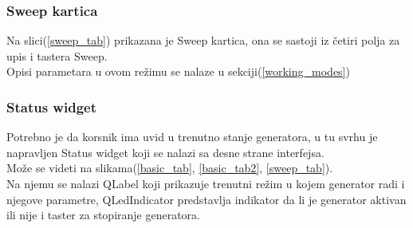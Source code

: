 \begin{figure}[H]
\end{figure}

\subsubsection{Sweep kartica}

Na slici(\ref{sweep_tab}) prikazana je Sweep kartica, ona se sastoji iz četiri
polja za upis i tastera Sweep. \\
Opisi parametara u ovom režimu se nalaze u sekciji(\ref{working_modes})

\begin{figure}[H]
\end{figure}

\subsubsection{Status widget}

Potrebno je da korsnik ima uvid u trenutno stanje generatora, u tu svrhu je
napravljen Status widget koji se nalazi sa desne strane interfejsa.\\
Može se videti na slikama(\ref{basic_tab}, \ref{basic_tab2}, \ref{sweep_tab}).
\\
Na njemu se nalazi QLabel\cite{QLabel} koji prikazuje trenutni režim u kojem
generator radi i njegove parametre, QLedIndicator\cite{QLedIndicator}
predstavlja indikator da li je generator aktivan ili nije i taster za stopiranje generatora.



